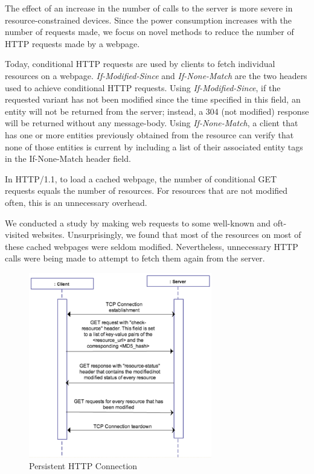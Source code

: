 \documentclass[9pt]{sigplan-proc-varsize}
\begin{document}
The effect of an increase in the number of calls to the server is more severe in resource-constrained devices. Since the power consumption increases with the number of requests made, we focus on novel methods to reduce the number of HTTP requests made by a webpage.

Today, conditional HTTP requests are used by clients to fetch individual resources on a webpage.  {\it If-Modified-Since} and {\it If-None-Match} are the two headers used to achieve conditional HTTP requests. Using {\it If-Modified-Since}, if the requested variant has not been modified since the time specified in this field, an entity will not be returned from the server; instead, a 304 (not modified) response will be returned without any message-body. Using {\it If-None-Match}, a client that has one or more entities previously obtained from the resource can verify that none of those entities is current by including a list of their associated entity tags in the If-None-Match header field.

In HTTP/1.1, to load a cached webpage, the number of conditional GET requests equals the number of resources. For resources that are not modified often, this is an unnecessary overhead.

We conducted a study by making web requests to some well-known and oft-visited websites. Unsurprisingly, we found that most of the resources on most of these cached webpages were seldom modified. Nevertheless, unnecessary HTTP calls were being made to attempt to fetch them again from the server.

\begin{figure}[ht!]
\centering
\includegraphics[width=80mm]{proposal}
\caption{Persistent HTTP Connection }
\label{fig:sp_gd_mnist}
\end{figure}
\end{document}
